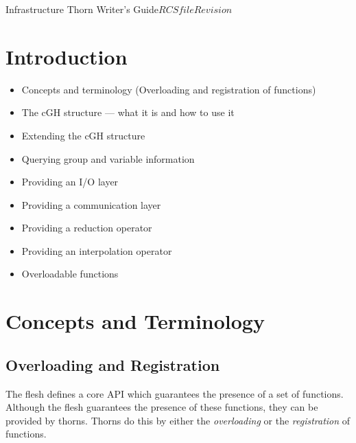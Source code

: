 
\begin{cactuspart}{Infrastructure Thorn Writer's Guide}{$RCSfile$}{$Revision$}
\label{part:Infrastructure}
\renewcommand{\thepage}{\Alph{part}\arabic{page}}


\chapter{Introduction}

\begin{itemize}
 \item{} Concepts and terminology (Overloading and registration of functions)
 \item{} The cGH structure --- what it is and how to use it
 \item{} Extending the cGH structure
 \item{} Querying group and variable information
 \item{} Providing an I/O layer
 \item{} Providing a communication layer
 \item{} Providing a reduction operator
 \item{} Providing an interpolation operator
 \item{} Overloadable functions
\end{itemize}

\chapter{Concepts and Terminology}
\label{chap:cote}

\section{Overloading and Registration}

The flesh defines a core API which guarantees the presence of a set of
functions.  Although the flesh guarantees the presence of these functions,
they can be provided by thorns.  Thorns do this by either the \textit{overloading}
or the \textit{registration} of functions.


\end{cactuspart}
